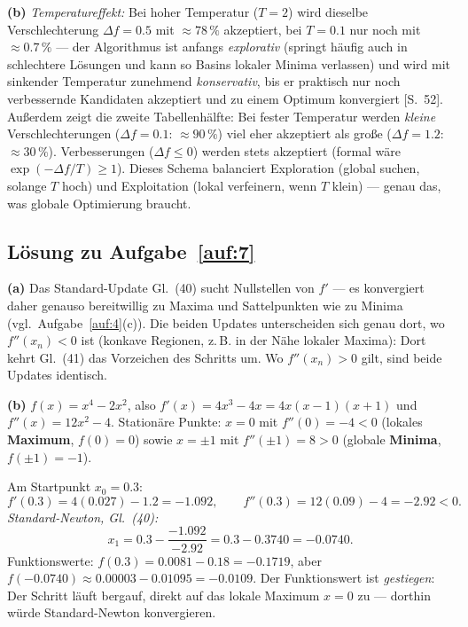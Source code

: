 \documentclass[a4paper,11pt]{scrartcl}
\begin{document}
\textbf{(b)} \emph{Temperatureffekt:} Bei hoher Temperatur ($T = 2$) wird dieselbe
Verschlechterung $\Delta f = 0.5$ mit $\approx 78\,\%$ akzeptiert, bei $T = 0.1$ nur noch
mit $\approx 0.7\,\%$ --- der Algorithmus ist anfangs \emph{explorativ} (springt häufig
auch in schlechtere Lösungen und kann so Basins lokaler Minima verlassen) und wird mit
sinkender Temperatur zunehmend \emph{konservativ}, bis er praktisch nur noch verbessernde
Kandidaten akzeptiert und zu einem Optimum konvergiert [S.~52]. Außerdem zeigt die
zweite Tabellenhälfte: Bei fester Temperatur werden \emph{kleine} Verschlechterungen
($\Delta f = 0.1$: $\approx 90\,\%$) viel eher akzeptiert als große
($\Delta f = 1.2$: $\approx 30\,\%$). Verbesserungen ($\Delta f \leq 0$) werden stets
akzeptiert (formal wäre $\exp(-\Delta f/T) \geq 1$). Dieses Schema balanciert Exploration
(global suchen, solange $T$ hoch) und Exploitation (lokal verfeinern, wenn $T$ klein) ---
genau das, was globale Optimierung braucht.

\subsection*{Lösung zu Aufgabe~\ref{auf:7}}

\textbf{(a)} Das Standard-Update Gl.~(40) sucht Nullstellen von $f'$ --- es konvergiert
daher genauso bereitwillig zu Maxima und Sattelpunkten wie zu Minima
(vgl.\ Aufgabe~\ref{auf:4}(c)). Die beiden Updates unterscheiden sich genau dort, wo
$f''(x_n) < 0$ ist (konkave Regionen, z.\,B. in der Nähe lokaler Maxima): Dort kehrt
Gl.~(41) das Vorzeichen des Schritts um. Wo $f''(x_n) > 0$ gilt, sind beide Updates
identisch.

\textbf{(b)} $f(x) = x^4 - 2x^2$, also $f'(x) = 4x^3 - 4x = 4x(x-1)(x+1)$ und
$f''(x) = 12x^2 - 4$. Stationäre Punkte: $x = 0$ mit $f''(0) = -4 < 0$ (lokales
\textbf{Maximum}, $f(0) = 0$) sowie $x = \pm 1$ mit $f''(\pm 1) = 8 > 0$ (globale
\textbf{Minima}, $f(\pm 1) = -1$).

Am Startpunkt $x_0 = 0.3$:
\[
  f'(0.3) = 4(0.027) - 1.2 = -1.092, \qquad f''(0.3) = 12(0.09) - 4 = -2.92 < 0.
\]
\emph{Standard-Newton, Gl.~(40):}
\[
  x_1 = 0.3 - \frac{-1.092}{-2.92} = 0.3 - 0.3740 = -0.0740.
\]
Funktionswerte: $f(0.3) = 0.0081 - 0.18 = -0.1719$, aber
$f(-0.0740) \approx 0.00003 - 0.01095 = -0.0109$. Der Funktionswert ist
\emph{gestiegen}: Der Schritt läuft bergauf, direkt auf das lokale Maximum $x = 0$ zu ---
dorthin würde Standard-Newton konvergieren.
\end{document}
